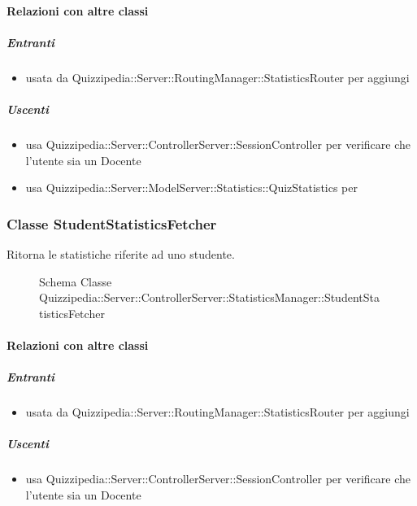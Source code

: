\paragraph{Relazioni con altre classi}
\subparagraph{Entranti}
\begin{itemize}
\item usata da Quizzipedia::Server::RoutingManager::StatisticsRouter per aggiungi
\end{itemize}
\subparagraph{Uscenti}
\begin{itemize}
\item usa Quizzipedia::Server::ControllerServer::SessionController per verificare che l'utente sia un Docente
\item usa Quizzipedia::Server::ModelServer::Statistics::QuizStatistics per 
\end{itemize}
\subsubsection{Classe StudentStatisticsFetcher}
Ritorna le statistiche riferite ad uno studente.
\begin{figure}[H]
\centering
\noindent{}
\caption[Schema Classe StudentStatisticsFetcher]{Schema Classe Quizzipedia::Server::ControllerServer::StatisticsManager::StudentStatisticsFetcher}
\end{figure}
\paragraph{Relazioni con altre classi}
\subparagraph{Entranti}
\begin{itemize}
\item usata da Quizzipedia::Server::RoutingManager::StatisticsRouter per aggiungi
\end{itemize}
\subparagraph{Uscenti}
\begin{itemize}
\item usa Quizzipedia::Server::ControllerServer::SessionController per verificare che l'utente sia un Docente
\end{itemize}
